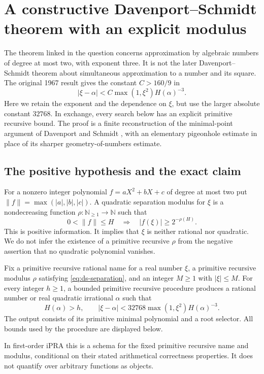 \section{A constructive Davenport--Schmidt theorem with an explicit modulus}
\label{sec:ds}

The theorem linked in the question concerns approximation by algebraic
numbers of degree at most two, with exponent three.  It is not the later
Davenport--Schmidt theorem about simultaneous approximation to a number and
its square.  The original 1967 result gives the constant
$C>160/9$ in
\[
  |\xi-\alpha|< C\max(1,\xi^2)H(\alpha)^{-3}.
\]
Here we retain the exponent and the dependence on $\xi$, but use the
larger absolute constant $32768$.  In exchange, every search below has an
explicit primitive recursive bound.  The proof is a finite reconstruction
of the minimal-point argument of Davenport and Schmidt
\cite{DavenportSchmidt1967}, with an elementary pigeonhole estimate in
place of its sharper geometry-of-numbers estimate.

\subsection{The positive hypothesis and the exact claim}

For a nonzero integer polynomial $f=aX^2+bX+c$ of degree at most two put
$\|f\|=\max(|a|,|b|,|c|)$.  A quadratic separation modulus for $\xi$ is a
nondecreasing function $\rho:\mathbb N_{\geq1}\to\mathbb N$ such that
\begin{equation}\label{eq:ds-separation}
  0<\|f\|\leq H\quad\Longrightarrow\quad
  |f(\xi)|\geq 2^{-\rho(H)}.
\end{equation}
This is positive information.  It implies that $\xi$ is neither rational
nor quadratic.  We do not infer the existence of a primitive recursive
$\rho$ from the negative assertion that no quadratic polynomial vanishes.

\begin{theorem}
\label{thm:ds-constructive}
Fix a primitive recursive rational name for a real number $\xi$, a
primitive recursive modulus $\rho$ satisfying
\eqref{eq:ds-separation}, and an integer $M\geq1$ with $|\xi|\leq M$.
For every integer $h\geq1$, a bounded primitive recursive procedure
produces a rational number or real quadratic irrational $\alpha$ such that
\[
 H(\alpha)>h,\qquad
 |\xi-\alpha|<32768\max(1,\xi^2)H(\alpha)^{-3}.
\]
The output consists of its primitive minimal polynomial and a root
selector.  All bounds used by the procedure are displayed below.

In first-order iPRA this is a schema for the fixed primitive recursive
name and modulus, conditional on their stated arithmetical correctness
properties.  It does not quantify over arbitrary functions as objects.
\end{theorem}

